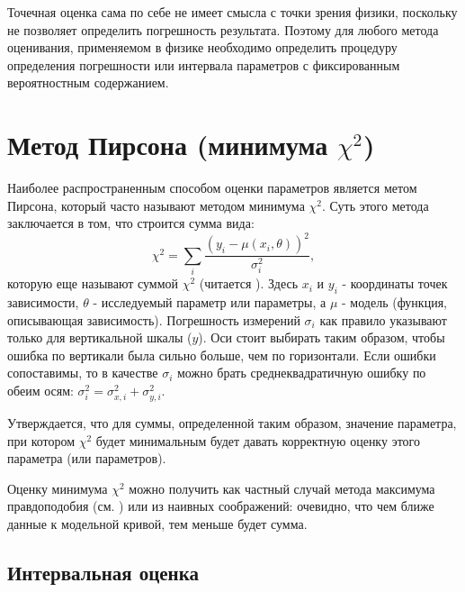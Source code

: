 Точечная оценка сама по себе не имеет смысла с точки зрения физики, поскольку не
позволяет определить погрешность результата. Поэтому для любого метода
оценивания, применяемом в физике необходимо определить процедуру определения
погрешности или интервала параметров с фиксированным вероятностным содержанием.

\section{Метод Пирсона (минимума \texorpdfstring{$\chi^{2}$}{chi2})}
\label{sec:chi2}

Наиболее распространенным способом оценки параметров является метом Пирсона,
который часто называют методом минимума $\chi^2$. Суть этого метода заключается
в том, что строится сумма вида:
\begin{equation}
    \chi^2 = \sum_i{\frac{(y_i - \mu(x_i,\theta))^2}{\sigma_i^2}},
\end{equation}
которую еще называют суммой $\chi^2$ (читается ). Здесь $x_i$ и $y_i$ - координаты точек
зависимости, $\theta$ - исследуемый параметр или параметры, а $\mu$ - модель
(функция, описывающая зависимость). Погрешность измерений $\sigma_i$ как правило
указывают только для вертикальной шкалы ($y$). Оси стоит выбирать таким образом,
чтобы ошибка по вертикали была сильно больше, чем по горизонтали. Если ошибки
сопоставимы, то в качестве $\sigma_i$ можно брать среднеквадратичную ошибку по
обеим осям: $\sigma_i^2 = \sigma_{x,i}^2 + \sigma_{y,i}^2$.

Утверждается, что для суммы, определенной таким образом, значение параметра, при
котором $\chi^2$ будет минимальным будет давать корректную оценку этого
параметра (или параметров).

Оценку минимума $\chi^2$ можно получить как частный случай метода максимума
правдоподобия (см. \cite{idie}) или из наивных соображений: очевидно, что чем ближе данные к
модельной кривой, тем меньше будет сумма.


\subsection{Интервальная оценка}

